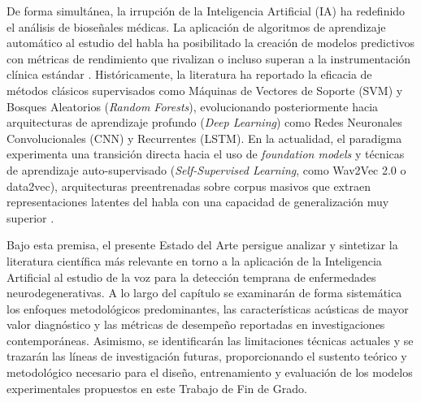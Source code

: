 De forma simultánea, la irrupción de la Inteligencia Artificial (IA) ha redefinido el análisis de bioseñales médicas. La aplicación de algoritmos de aprendizaje automático al estudio del habla ha posibilitado la creación de modelos predictivos con métricas de rendimiento que rivalizan o incluso superan a la instrumentación clínica estándar \cite{moro-velazquezUsingXVectorsAutomatically2020}. Históricamente, la literatura ha reportado la eficacia de métodos clásicos supervisados como Máquinas de Vectores de Soporte (SVM) y Bosques Aleatorios (\textit{Random Forests}), evolucionando posteriormente hacia arquitecturas de aprendizaje profundo (\textit{Deep Learning}) como Redes Neuronales Convolucionales (CNN) y Recurrentes (LSTM). En la actualidad, el paradigma experimenta una transición directa hacia el uso de \textit{foundation models} y técnicas de aprendizaje auto-supervisado (\textit{Self-Supervised Learning}, como Wav2Vec 2.0 o data2vec), arquitecturas preentrenadas sobre corpus masivos que extraen representaciones latentes del habla con una capacidad de generalización muy superior \cite{baevski2020, agbavorArtificialIntelligenceEnabledEndToEnd2023}.

Bajo esta premisa, el presente Estado del Arte persigue analizar y sintetizar la literatura científica más relevante en torno a la aplicación de la Inteligencia Artificial al estudio de la voz para la detección temprana de enfermedades neurodegenerativas. A lo largo del capítulo se examinarán de forma sistemática los enfoques metodológicos predominantes, las características acústicas de mayor valor diagnóstico y las métricas de desempeño reportadas en investigaciones contemporáneas. Asimismo, se identificarán las limitaciones técnicas actuales y se trazarán las líneas de investigación futuras, proporcionando el sustento teórico y metodológico necesario para el diseño, entrenamiento y evaluación de los modelos experimentales propuestos en este Trabajo de Fin de Grado.